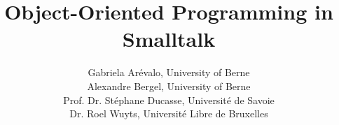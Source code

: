 \let\wholebook=\relax


\title{Object-Oriented Programming in Smalltalk}
\author{Gabriela Ar\'evalo, University of Berne \\
Alexandre Bergel, University of Berne  \\
Prof. Dr. St\'ephane Ducasse, Universit\'e de Savoie  \\
Dr. Roel Wuyts, Universit\'e Libre de Bruxelles \\
}


\maketitle






